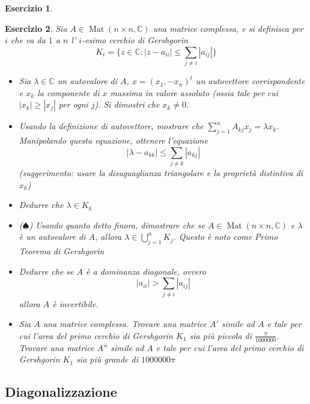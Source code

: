 \documentclass{article}
\newtheorem{es}{Esercizio}
\begin{document}
{\begin{es}
    
\end{es}


\begin{es} 
    Sia $A\in \operatorname{Mat}(n\times n,\mathbb{C})$ una matrice complessa, e si definisca per $i$ che va da $1$ a $n$ l' $i$-esimo cerchio di Gershgorin
    $$K_i=\{z\in\mathbb{C}:|z-a_{ii}|\leq \sum_{j\neq i} |a_{ij}|\}$$
    \begin{itemize}
        \item Sia $\lambda\in\mathbb{C}$ un autovalore di $A$, $x=(x_1,\cdots x_n)^t$ un autovettore corrispondente e $x_k$ la componente di $x$ massima in valore assoluto (ossia tale per cui $|x_k|\geq |x_j|$ per ogni $j$). Si dimostri che $x_k\neq 0$.
        \item Usando la definizione di autovettore, mostrare che $\sum_{j=1}^n A_{kj}x_j=\lambda x_k$. Manipolando questa equazione, ottenere l'equazione $$|\lambda-a_{kk}|\leq \sum_{j\neq k} |a_{kj}|$$ (suggerimento: usare la disuguaglianza triangolare e la proprietà distintiva di $x_k$)\\
        \item Dedurre che $\lambda \in K_k$
        \item ($\spadesuit$) Usando quanto detto finora, dimostrare che se $A\in\operatorname{Mat}(n\times n,\mathbb{C})$ e $\lambda$ è un autovalore di $A$, allora $\lambda\in\bigcup_{j=1}^n K_j$. Questo è noto come Primo Teorema di Gershgorin
        \item Dedurre che se $A$ è a dominanza diagonale, ovvero $$|a_{ii}|> \sum_{j\neq i} |a_{ij}|$$ allora $A$ è invertibile.
        \item Sia $A$ una matrice complessa. Trovare una matrice $A'$ simile ad $A$ e tale per cui l'area del primo cerchio di Gershgorin $K_1$ sia più piccola di $\frac{\pi}{1000000}$. Trovare una matrice $A''$ simile ad $A$ e tale per cui l'area del primo cerchio di Gershgorin $K_1$ sia più grande di $1000000\pi$
    \end{itemize}
\end{es}









\subsection{Diagonalizzazione}



}
\end{document}
